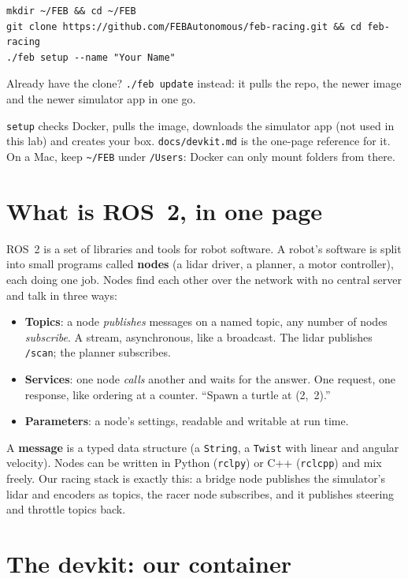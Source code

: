 \documentclass[11pt,a4paper]{article}
\begin{document}
\begin{lstlisting}
mkdir ~/FEB && cd ~/FEB
git clone https://github.com/FEBAutonomous/feb-racing.git && cd feb-racing
./feb setup --name "Your Name"
\end{lstlisting}

Already have the clone? \texttt{./feb update} instead: it pulls the repo, the newer image and
the newer simulator app in one go.

\texttt{setup} checks Docker, pulls the image, downloads the simulator app (not used in this
lab) and creates your box. \texttt{docs/devkit.md} is the one-page reference for it. On a Mac,
keep \texttt{\textasciitilde/FEB} under \texttt{/Users}: Docker can only mount folders from there.

\section{What is ROS~2, in one page}

ROS~2 is a set of libraries and tools for robot software. A robot's software is split into small
programs called \textbf{nodes} (a lidar driver, a planner, a motor controller), each doing one
job. Nodes find each other over the network with no central server and talk in three ways:

\begin{itemize}
  \item \textbf{Topics}: a node \emph{publishes} messages on a named topic, any number of nodes
  \emph{subscribe}. A stream, asynchronous, like a broadcast. The lidar publishes \texttt{/scan};
  the planner subscribes.
  \item \textbf{Services}: one node \emph{calls} another and waits for the answer. One request, one
  response, like ordering at a counter. ``Spawn a turtle at (2,~2).''
  \item \textbf{Parameters}: a node's settings, readable and writable at run time.
\end{itemize}

A \textbf{message} is a typed data structure (a \texttt{String}, a \texttt{Twist} with linear and
angular velocity). Nodes can be written in Python (\texttt{rclpy}) or C++ (\texttt{rclcpp}) and
mix freely. Our racing stack is exactly this: a bridge node publishes the simulator's lidar and
encoders as topics, the racer node subscribes, and it publishes steering and throttle topics
back.

\section{The devkit: our container}
\end{document}
